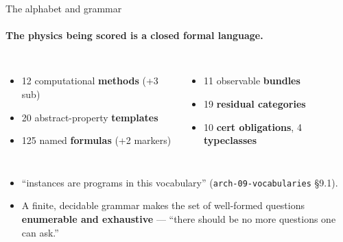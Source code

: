 \documentclass[aspectratio=169,10pt]{beamer}
\newcommand{\code}[1]{\texttt{#1}}
\newcommand{\cz}[1]{({\scriptsize\color{gray}#1})}     %
\begin{document}
\begin{frame}{The alphabet and grammar}
  \framesubtitle{The physics being scored is a closed formal language.}
  \begin{columns}[T]
    \begin{itemize}
      \item 12 computational \textbf{methods} (+3 sub)
      \item 20 abstract-property \textbf{templates}
      \item 125 named \textbf{formulas} (+2 markers)
    \end{itemize}
    \begin{itemize}
      \item 11 observable \textbf{bundles}
      \item 19 \textbf{residual categories}
      \item 10 \textbf{cert obligations}, 4 \textbf{typeclasses}
    \end{itemize}
  \end{columns}
  \vspace{0.8em}
  \begin{itemize}
    \item ``instances are programs in this vocabulary'' \cz{\code{arch-09-vocabularies} \S9.1}.
    \item A finite, decidable grammar makes the set of well-formed questions \textbf{enumerable
      and exhaustive} --- ``there should be no more questions one can ask.''
  \end{itemize}
\end{frame}
\end{document}
